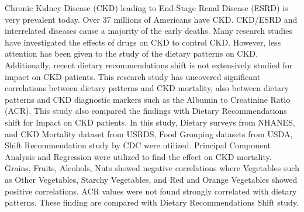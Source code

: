 Chronic Kidney Disease (CKD) leading to End-Stage Renal Disease (ESRD) is very prevalent today. Over 37 millions of Americans have CKD. CKD/ESRD and interrelated diseases cause a majority of the early deaths.  Many research studies have investigated the effects of drugs on CKD to control CKD. However, less attention has been given to the study of the dietary patterns on CKD. Additionally, recent dietary recommendations shift is not extensively studied for impact on CKD patients. This research study has uncovered significant correlations between dietary patterns and CKD mortality, also between  dietary patterns  and CKD diagnostic markers such as the Albumin to Creatinine Ratio (ACR). This study also compared the findings with Dietary Recommendations shift for Impact on CKD patients. In this study, Dietary surveys from NHANES, and CKD Mortality dataset from USRDS, Food Grouping datasets from USDA, Shift Recommendation study by CDC were utilized. Principal Component Analysis and Regression were utilized to find the effect on CKD mortality. Grains, Fruits, Alcohols, Nuts showed negative correlations where Vegetables such as Other Vegetables, Starchy Vegetables, and Red and Orange Vegetables showed positive correlations. ACR values were not found strongly correlated with dietary patterns. These finding are compared with Dietary Recommendations Shift study.

